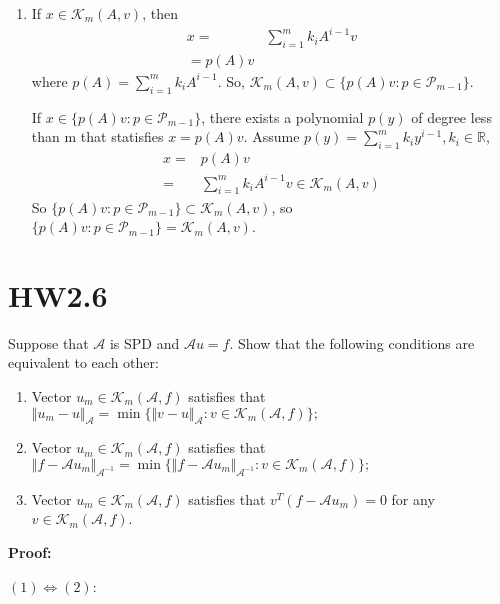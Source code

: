 \documentclass{article}
\begin{document}
\begin{enumerate}[(1)]
    \item If $x\in \mathcal{K}_m(A,v)$, then
          \begin{equation*}
              \begin{aligned}
                  x= & \sum_{i=1}^{m} k_i A^{i-1}v \\
                  = p(A) v
              \end{aligned}
          \end{equation*}
          where $p(A)=\sum_{i=1}^{m} k_i A^{i-1}$. So, $\mathcal{K}_m(A,v)\subset \{p(A)v:p\in\mathcal{P}_{m-1}\}$.

          If $x\in \{p(A)v:p\in\mathcal{P}_{m-1}\}$, there exists a polynomial $p(y)$ of
          degree less than m that statisfies $x=p(A)v$. Assume $p(y)=\sum_{i=1}^{m} k_i y^{i-1}, k_i\in\mathbb{R}$,
          \begin{equation*}
              \begin{aligned}
                  x= & p(A)v                          \\
                  =  & \sum_{i=1}^{m} k_i A^{i-1}v\in
                  \mathcal{K}_m(A,v)\end{aligned}
          \end{equation*}
          So $\{p(A)v:p\in\mathcal{P}_{m-1}\}\subset \mathcal{K}_m(A,v)$, so $\{p(A)v:p\in\mathcal{P}_{m-1}\}=\mathcal{K}_m(A,v)$.
\end{enumerate}
\section{HW2.6}
Suppose that $\mathcal{A}$ is SPD and $\mathcal{A}u = f$. Show that the following conditions are equivalent
to each other:
\begin{enumerate}[(1)]
    \item Vector $u_m\in\mathcal{K}_m(\mathcal{A},f)$  satisfies that $\Vert u_m-u\Vert_\mathcal{A}=\min\{\Vert v-u\Vert_\mathcal{A}:v\in \mathcal{K}_m(\mathcal{A},f)\};$
    \item Vector $u_m\in\mathcal{K}_m(\mathcal{A},f)$  satisfies that $\Vert f-\mathcal{A}u_m\Vert_{\mathcal{A}^{-1}}=\min\{\Vert f-\mathcal{A}u_m\Vert_{\mathcal{A}^{-1}}:v\in \mathcal{K}_m(\mathcal{A},f)\};$
    \item Vector $u_m\in\mathcal{K}_m(\mathcal{A},f)$  satisfies that $v^T( f-\mathcal{A}u_m)=0$  for any $v\in \mathcal{K}_m(\mathcal{A},f)$.
\end{enumerate}
\textbf{Proof:}

$(1)\Leftrightarrow (2)$:
\end{document}
